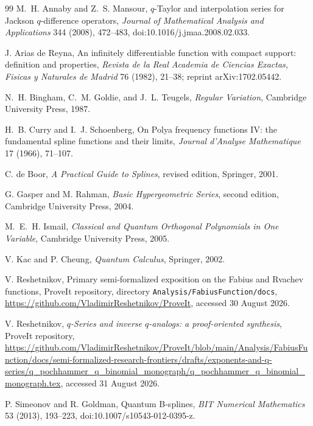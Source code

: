 \begin{thebibliography}{99}
M.~H. Annaby and Z.~S. Mansour,
\newblock $q$-Taylor and interpolation series for Jackson $q$-difference
operators,
\newblock \emph{Journal of Mathematical Analysis and Applications} 344 (2008),
472--483,
\newblock doi:10.1016/j.jmaa.2008.02.033.

J. Arias de Reyna,
\newblock An infinitely differentiable function with compact support:
definition and properties,
\newblock \emph{Revista de la Real Academia de Ciencias Exactas, Fisicas y
Naturales de Madrid} 76 (1982), 21--38;
\newblock reprint arXiv:1702.05442.

N.~H. Bingham, C.~M. Goldie, and J.~L. Teugels,
\newblock \emph{Regular Variation},
\newblock Cambridge University Press, 1987.

H.~B. Curry and I.~J. Schoenberg,
\newblock On Polya frequency functions IV: the fundamental spline functions
and their limits,
\newblock \emph{Journal d'Analyse Mathematique} 17 (1966), 71--107.

C. de Boor,
\newblock \emph{A Practical Guide to Splines}, revised edition,
\newblock Springer, 2001.

G. Gasper and M. Rahman,
\newblock \emph{Basic Hypergeometric Series}, second edition,
\newblock Cambridge University Press, 2004.

M.~E.~H. Ismail,
\newblock \emph{Classical and Quantum Orthogonal Polynomials in One Variable},
\newblock Cambridge University Press, 2005.

V. Kac and P. Cheung,
\newblock \emph{Quantum Calculus},
\newblock Springer, 2002.

V. Reshetnikov,
\newblock Primary semi-formalized exposition on the Fabius and Rvachev
functions,
\newblock ProveIt repository, directory
\texttt{Analysis/FabiusFunction/docs},
\newblock \url{https://github.com/VladimirReshetnikov/ProveIt},
accessed 30 August 2026.

V. Reshetnikov,
\newblock \emph{$q$-Series and inverse $q$-analogs: a proof-oriented
synthesis},
\newblock ProveIt repository,
\newblock \url{https://github.com/VladimirReshetnikov/ProveIt/blob/main/Analysis/FabiusFunction/docs/semi-formalized-research-frontiers/drafts/exponents-and-q-series/q_pochhammer_q_binomial_monograph/q_pochhammer_q_binomial_monograph.tex},
accessed 31 August 2026.

P. Simeonov and R. Goldman,
\newblock Quantum B-splines,
\newblock \emph{BIT Numerical Mathematics} 53 (2013), 193--223,
\newblock doi:10.1007/s10543-012-0395-z.


\end{thebibliography}
